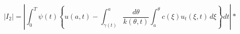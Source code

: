 \documentclass{article}
\begin{document}
\[ |I_2|=\left| \int_{0}^T \psi(t) \left\{ u(a,t)- \int_{\gamma(t)}^a \frac{d\theta}{k(\theta,t)} \int_{a}^\theta c(\xi)u_t(\xi,t)\,d\xi \right\} dt \right| *\]
\pagebreak
\end{document}
